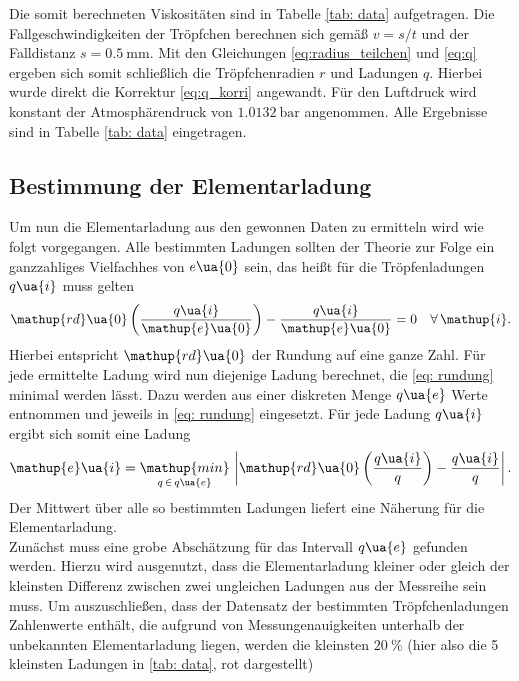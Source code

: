 Die somit berechneten Viskositäten sind in Tabelle \ref{tab: data} aufgetragen.
Die Fallgeschwindigkeiten der Tröpfchen berechnen sich gemäß $v = s/t$ und der Falldistanz $s = \SI{0.5}{\milli\meter}$.
Mit den Gleichungen \eqref{eq:radius_teilchen} und \eqref{eq:q} ergeben sich somit schließlich die Tröpfchenradien $r$ und Ladungen $q$. Hierbei wurde
direkt die Korrektur \eqref{eq:q_korri} angewandt. Für den Luftdruck wird konstant der Atmosphärendruck von
$\SI{1.0132}{\bar}$ angenommen. Alle Ergebnisse sind in Tabelle \ref{tab: data} eingetragen. \\


\subsection{Bestimmung der Elementarladung}
Um nun die Elementarladung aus den gewonnen Daten zu ermitteln wird wie folgt vorgegangen. Alle bestimmten
Ladungen sollten der Theorie zur Folge ein ganzzahliges Vielfachhes von $e\ua{0}$ sein, das heißt für die
Tröpfenladungen $q\ua{i}$ muss gelten
\begin{equation}
  \mathup{rd}\ua{0}\left(\frac{q\ua{i}}{\mathup{e}\ua{0}}\right) - \frac{q\ua{i}}{\mathup{e}\ua{0}} = 0 \quad \forall\, \mathup{i}.
  \label{eq: rundung}
\end{equation}
Hierbei entspricht $\mathup{rd}\ua{0}$ der Rundung auf eine ganze Zahl. Für jede ermittelte Ladung wird nun diejenige
Ladung berechnet, die \eqref{eq: rundung} minimal werden lässt. Dazu werden aus einer diskreten Menge $q\ua{e}$ Werte entnommen
und jeweils in \eqref{eq: rundung} eingesetzt. Für jede Ladung $q\ua{i}$ ergibt sich somit eine Ladung
\begin{equation}
  \mathup{e}\ua{i} = \underset{q\, \in \,q\ua{e}}{\mathup{min}}\, \left|\mathup{rd}\ua{0}\left(\frac{q\ua{i}}{q}\right) - \frac{q\ua{i}}{q}\right|.
\end{equation}
Der Mittwert über alle so bestimmten Ladungen liefert eine Näherung für die Elementarladung.\\
Zunächst muss eine grobe Abschätzung für das Intervall $q\ua{e}$ gefunden werden. Hierzu wird ausgenutzt, dass die Elementarladung
kleiner oder gleich der kleinsten Differenz zwischen zwei ungleichen Ladungen aus der Messreihe sein muss. Um auszuschließen, dass
der Datensatz der bestimmten Tröpfchenladungen Zahlenwerte enthält, die aufgrund von Messungenauigkeiten unterhalb
der unbekannten Elementarladung liegen, werden die kleinsten $\SI{20}{\percent}$ (hier also die 5 kleinsten Ladungen in \ref{tab: data}, rot dargestellt)
